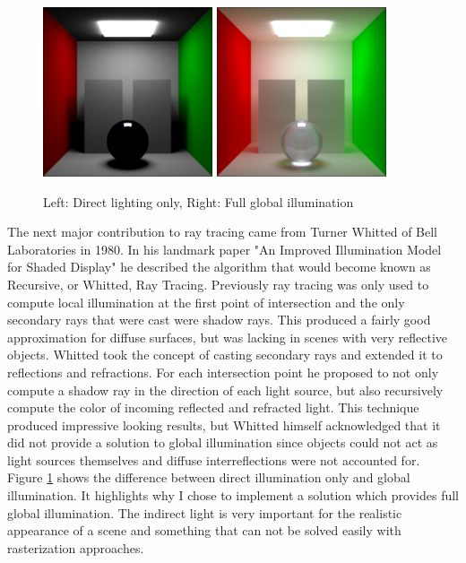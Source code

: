 \documentclass{ACGSeminar}
\begin{document}
\begin{figure}[htb!]
  \centering
  \includegraphics[width=5cm,natwidth=512,natheight=512]{figures/bounces_one.png}
  \includegraphics[width=5cm,natwidth=512,natheight=512]{figures/bounces_many.png}
  \caption{Left: Direct lighting only, Right: Full global illumination}
  \label{fig:rendering-bounces}
\end{figure}

The next major contribution to ray tracing came from Turner Whitted of Bell Laboratories in 1980. In his landmark paper "An Improved Illumination Model for Shaded Display" \cite{Whitted:1980} he described the algorithm that would become known as Recursive, or Whitted, Ray Tracing. Previously ray tracing was only used to compute local illumination at the first point of intersection and the only secondary rays that were cast were shadow rays. This produced a fairly good approximation for diffuse surfaces, but was lacking in scenes with very reflective objects. Whitted took the concept of casting secondary rays and extended it to reflections and refractions. For each intersection point he proposed to not only compute a shadow ray in the direction of each light source, but also recursively compute the color of incoming reflected and refracted light. This technique produced impressive looking results, but Whitted himself acknowledged that it did not provide a solution to global illumination since objects could not act as light sources themselves and diffuse interreflections were not accounted for. Figure \ref{fig:rendering-bounces} shows the difference between direct illumination only and global illumination. It highlights why I chose to implement a solution which provides full global illumination. The indirect light is very important for the realistic appearance of a scene and something that can not be solved easily with rasterization approaches.
\end{document}
